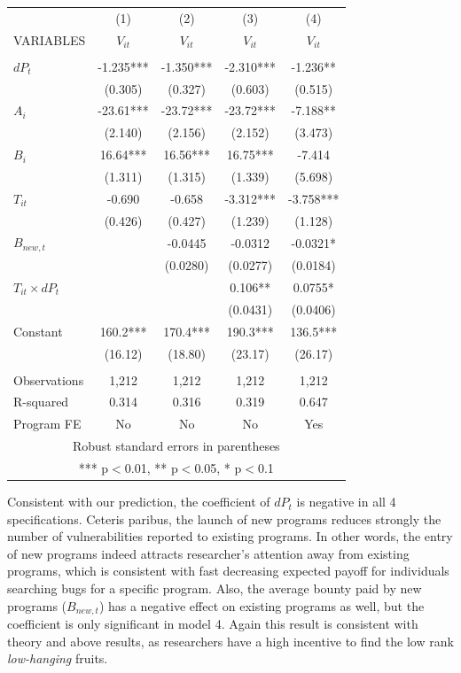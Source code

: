 \begin{table}
	\centering
	\begin{tabular}{lcccc} \hline
		& (1) & (2) & (3) & (4) \\
		VARIABLES & $V_{it}$ & $V_{it}$ & $V_{it}$ & $V_{it}$ \\ \hline
		&  &  &  &  \\
		$dP_t$ & -1.235*** & -1.350*** & -2.310*** & -1.236** \\
		& (0.305) & (0.327) & (0.603) & (0.515) \\
		$A_i$ & -23.61*** & -23.72*** & -23.72*** & -7.188** \\
		& (2.140) & (2.156) & (2.152) & (3.473) \\
		$B_i$ & 16.64*** & 16.56*** & 16.75*** & -7.414 \\
		& (1.311) & (1.315) & (1.339) & (5.698) \\
		$T_{it}$ & -0.690 & -0.658 & -3.312*** & -3.758*** \\
		& (0.426) & (0.427) & (1.239) & (1.128) \\
		$B_{new,t}$ &  & -0.0445 & -0.0312 & -0.0321* \\
		&  & (0.0280) & (0.0277) & (0.0184) \\
		$T_{it} \times dP_t$ &  &  & 0.106** & 0.0755* \\
		&  &  & (0.0431) & (0.0406) \\
		Constant & 160.2*** & 170.4*** & 190.3*** & 136.5*** \\
		& (16.12) & (18.80) & (23.17) & (26.17) \\
		&  &  &  &  \\
		Observations & 1,212 & 1,212 & 1,212 & 1,212 \\
		R-squared & 0.314 & 0.316 & 0.319 & 0.647 \\
		Program FE & No & No & No & Yes \\ \hline
		\multicolumn{5}{c}{ Robust standard errors in parentheses} \\
		\multicolumn{5}{c}{ *** p$<$0.01, ** p$<$0.05, * p$<$0.1} \\
	\end{tabular}
	\label{tab:reg}
\end{table}

\noindent Consistent with our prediction, the coefficient of $dP_t$ is negative in all 4 specifications. Ceteris paribus, the launch of new programs reduces strongly the number of vulnerabilities reported to existing programs. In other words, the entry of new programs indeed attracts researcher's attention away from existing programs, which is consistent with fast decreasing expected payoff for individuals searching bugs for a specific program. Also, the average bounty paid by new programs ($B_{new,t}$) has a negative effect on existing programs as well, but the coefficient is only significant in model 4. Again this result is consistent with theory and above results, as researchers have a high incentive to find the low rank {\it low-hanging} fruits.\\

